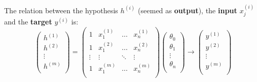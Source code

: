 \begin{itemize}
    The relation between the hypothesis $h^{(i)}$ (seemed as \textbf{output}), the \textbf{input} $x_j^{(i)}$ and the \textbf{target} $y^{(i)}$ is:
    \begin{equation}
        \left(
            \begin{matrix}
                h^{(1)} \\
                h^{(2)} \\
                \vdots  \\
                h^{(m)} \\
            \end{matrix}
        \right) =
        \left(
        \begin{matrix}
            1         & x_1^{(1)} & \dots  & x_n^{(1)}\\
            1         & x_1^{(2)} & \dots  & x_n^{(2)}\\
            \vdots    & \vdots    & \ddots & \vdots   \\
            1         & x_1^{(m)} & \dots  & x_n^{(m)}\\
        \end{matrix}
        \right)
        \left(
        \begin{matrix}
            \theta_0\\
            \theta_1\\
            \vdots  \\
            \theta_n\\
        \end{matrix}
        \right)\rightarrow
        \left(
        \begin{matrix}
            y^{(1)} \\
            y^{(2)} \\
            \vdots  \\
            y^{(m)} \\
        \end{matrix}
        \right)
    \end{equation}
\end{itemize}


